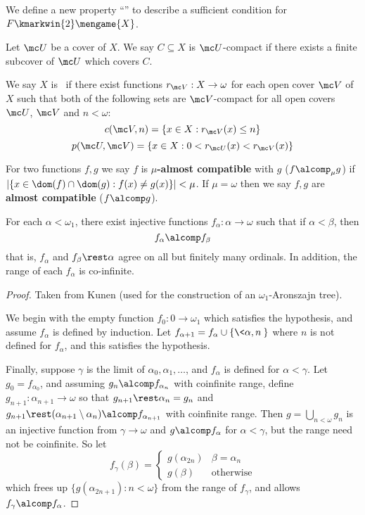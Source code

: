   We define a new property ``\scish'' to describe a sufficient condition for $F \kmarkwin{2}\mengame{X}$.

  \begin{defn}
    Let $\mc U$ be a cover of $X$. We say $C\subseteq X$ is $\mc U$-compact if there exists a finite subcover of $\mc U$ which covers $C$.

    We say $X$ is \scish~if there exist functions $r_{\mc V}:X\to\omega$ for each open cover $\mc V$ of $X$ such that both of the following sets are $\mc V$-compact for all open covers $\mc U$, $\mc V$ and $n<\omega$:
      \[
        c(\mc V,n)=\{ x\in X : r_{\mc V}(x)\leq n\}
      \]
      \[
        p(\mc U,\mc V)=\{ x\in X : 0<r_{\mc U}(x)<r_{\mc V}(x)\}
      \]
  \end{defn}

  \begin{defn}
    For two functions $f,g$ we say $f$ is \textbf{$\mu$-almost compatible} with $g$ ($f\alcomp_\mu g$) if $|\{x\in\dom(f)\cap\dom(g):f(x)\not=g(x)\}|<\mu$. If $\mu=\omega$ then we say $f,g$ are \textbf{almost compatible} ($f\alcomp g$).
  \end{defn}

  \begin{lem}\label{kunlem}
    For each $\alpha<\omega_1$, there exist injective functions $f_\alpha:\alpha\to\omega$ such that if $\alpha<\beta$, then \[f_\alpha \alcomp f_\beta\] that is, $f_\alpha$ and $f_\beta\rest\alpha$ agree on all but finitely many ordinals. In addition, the range of each $f_\alpha$ is co-infinite.
  \end{lem}

  \begin{proof}
    Taken from Kunen (used for the construction of an $\omega_1$-Aronszajn tree).

    We begin with the empty function $f_0:0\to\omega_1$ which satisfies the hypothesis, and assume $f_\alpha$ is defined by induction. Let $f_{\alpha+1} = f_\alpha \cup \{\<\alpha,n\>\}$ where $n$ is not defined for $f_\alpha$, and this satisfies the hypothesis.

    Finally, suppose $\gamma$ is the limit of $\alpha_0,\alpha_1,\dots$, and $f_\alpha$ is defined for $\alpha<\gamma$. Let $g_0=f_{\alpha_0}$, and assuming $g_n\alcomp f_{\alpha_n}$ with coinfinite range, define $g_{n+1}:\alpha_{n+1}\to\omega$ so that $g_{n+1}\rest\alpha_n=g_n$ and $g_{n+1}\rest(\alpha_{n+1}\setminus\alpha_n)\alcomp f_{\alpha_{n+1}}$ with coinfinite range. Then $g=\bigcup_{n<\omega} g_n$ is an injective function from $\gamma \to \omega$ and $g \alcomp f_\alpha$ for $\alpha <\gamma$, but the range need not be coinfinite. So let
    \[
      f_\gamma(\beta) = \left\{
      \begin{array}{ll}
        g(\alpha_{2n}) & \beta = \alpha_n \\
        g(\beta) & \text{otherwise}
      \end{array}
      \right.
    \]
    which frees up $\{g(\alpha_{2n+1}):n<\omega\}$ from the range of $f_\gamma$, and allows $f_\gamma\alcomp f_\alpha$.
  \end{proof}

